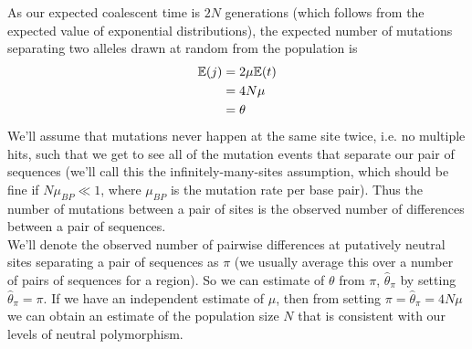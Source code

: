 As our expected coalescent time is $2N$ generations (which follows from the expected value of exponential distributions), the expected
number of mutations separating two alleles drawn at random from the
population is
%
\begin{align}
  \mathbb{E}(j) &= 2\mu\mathbb{E}(t) \\ \nonumber
  &= 4N\mu \\
  &= \theta \nonumber
\end{align}
We'll assume that mutations never happen at the same site twice,
i.e. no multiple hits, such that we get to see all of the mutation events that separate our pair
of sequences (we'll call this the infinitely-many-sites assumption,
which should be fine if $N\mu_{BP} \ll 1$, where $\mu_{BP}$ is the mutation rate per base pair). Thus the number of
mutations between a pair of sites is the observed number of
differences between a pair of sequences. \\




We'll denote the observed number of pairwise differences at putatively neutral
sites separating a pair of sequences as $\pi$ (we usually average this over a
number of pairs of sequences for a region). So we can estimate of $\theta$ from
$\pi$, $\widehat{\theta}_{\pi}$ by setting $\widehat{\theta}_{\pi}=\pi$.  If we
have an independent estimate of $\mu$, then from setting $\pi =
\widehat{\theta}_{\pi} = 4N\mu$ we can obtain an estimate of the population
size $N$ that is consistent with our levels of neutral polymorphism.


